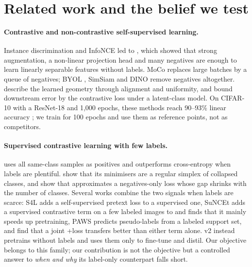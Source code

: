 \section{Related work and the belief we test}
\label{sec:related}

\paragraph{Contrastive and non-contrastive self-supervised learning.}
Instance discrimination \citep{wu2018instance} and InfoNCE \citep{oord2018cpc,sohn2016npair} led to \simclr
\citep{chen2020simclr}, which showed that strong augmentation, a non-linear projection head and many
negatives are enough to learn linearly separable features without labels. MoCo \citep{he2020moco,chen2021mocov3}
replaces large batches by a queue of negatives; BYOL \citep{grill2020byol}, SimSiam \citep{chen2021simsiam}
and DINO \citep{caron2021dino} remove negatives altogether. \citet{wang2020alignment} describe the learned
geometry through alignment and uniformity, and \citet{arora2019theoretical} bound downstream error by the
contrastive loss under a latent-class model. On CIFAR-10 with a ResNet-18 and 1,000 epochs, these methods
reach 90--93\% linear accuracy \citep{dacosta2022sololearn}; we train for 100 epochs and use them as
reference points, not as competitors.

\paragraph{Supervised contrastive learning with few labels.}
\supcon \citep{khosla2020supcon} uses all same-class samples as positives and outperforms cross-entropy
when labels are plentiful. \citet{graf2021dissecting} show that its minimisers are a regular simplex of
collapsed classes, and \citet{luthra2025approximately} show that \simclr approximates a negatives-only
\supcon loss whose gap shrinks with the number of classes. Several works combine the two signals when labels
are scarce: S4L \citep{zhai2019s4l} adds a self-supervised pretext loss to a supervised one, SuNCEt
\citep{assran2020suncet} adds a supervised contrastive term on a few labeled images to \simclr and finds that
it mainly speeds up pretraining, PAWS \citep{assran2021paws} predicts pseudo-labels from a labeled support
set, and \citet{islam2021broad} find that a joint \simclr+\supcon loss transfers better than either term
alone. \simclr v2 \citep{chen2020simclrv2} instead pretrains without labels and uses them only to fine-tune and
distil. Our \union objective belongs to this family; our contribution is not the objective but a controlled
answer to \emph{when and why} its label-only counterpart falls short.

